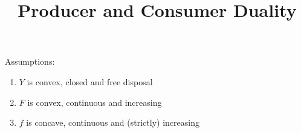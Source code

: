 \documentclass{article}
\title{Producer and Consumer Duality}
\begin{document}

\noindent
Assumptions:
\begin{enumerate}
  \item $Y$ is convex, closed and free disposal
  \item $F$ is convex, continuous and increasing
  \item $f$ is concave, continuous and (strictly) increasing
\end{enumerate}

\setlength\extrarowheight{10pt}
\end{document}
